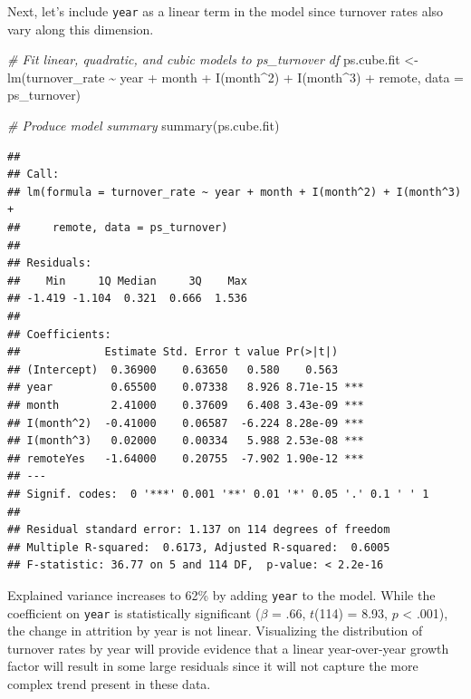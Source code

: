 \documentclass[
]{book}
\newenvironment{Shaded}{\begin{snugshade}}{\end{snugshade}}
\newcommand{\AttributeTok}[1]{\textcolor[rgb]{0.77,0.63,0.00}{#1}}
\newcommand{\CommentTok}[1]{\textcolor[rgb]{0.56,0.35,0.01}{\textit{#1}}}
\newcommand{\DecValTok}[1]{\textcolor[rgb]{0.00,0.00,0.81}{#1}}
\newcommand{\FunctionTok}[1]{\textcolor[rgb]{0.00,0.00,0.00}{#1}}
\newcommand{\NormalTok}[1]{#1}
\newcommand{\OtherTok}[1]{\textcolor[rgb]{0.56,0.35,0.01}{#1}}
\newcommand{\SpecialCharTok}[1]{\textcolor[rgb]{0.00,0.00,0.00}{#1}}
\begin{document}
Next, let's include \texttt{year} as a linear term in the model since turnover rates also vary along this dimension.

\begin{Shaded}
\begin{Highlighting}[]
\CommentTok{\# Fit linear, quadratic, and cubic models to ps\_turnover df}
\NormalTok{ps.cube.fit }\OtherTok{\textless{}{-}} \FunctionTok{lm}\NormalTok{(turnover\_rate }\SpecialCharTok{\textasciitilde{}}\NormalTok{ year }\SpecialCharTok{+}\NormalTok{ month }\SpecialCharTok{+} \FunctionTok{I}\NormalTok{(month}\SpecialCharTok{\^{}}\DecValTok{2}\NormalTok{) }\SpecialCharTok{+} \FunctionTok{I}\NormalTok{(month}\SpecialCharTok{\^{}}\DecValTok{3}\NormalTok{) }\SpecialCharTok{+}\NormalTok{ remote, }\AttributeTok{data =}\NormalTok{ ps\_turnover)}

\CommentTok{\# Produce model summary}
\FunctionTok{summary}\NormalTok{(ps.cube.fit)}
\end{Highlighting}
\end{Shaded}

\begin{verbatim}
## 
## Call:
## lm(formula = turnover_rate ~ year + month + I(month^2) + I(month^3) + 
##     remote, data = ps_turnover)
## 
## Residuals:
##    Min     1Q Median     3Q    Max 
## -1.419 -1.104  0.321  0.666  1.536 
## 
## Coefficients:
##             Estimate Std. Error t value Pr(>|t|)    
## (Intercept)  0.36900    0.63650   0.580    0.563    
## year         0.65500    0.07338   8.926 8.71e-15 ***
## month        2.41000    0.37609   6.408 3.43e-09 ***
## I(month^2)  -0.41000    0.06587  -6.224 8.28e-09 ***
## I(month^3)   0.02000    0.00334   5.988 2.53e-08 ***
## remoteYes   -1.64000    0.20755  -7.902 1.90e-12 ***
## ---
## Signif. codes:  0 '***' 0.001 '**' 0.01 '*' 0.05 '.' 0.1 ' ' 1
## 
## Residual standard error: 1.137 on 114 degrees of freedom
## Multiple R-squared:  0.6173, Adjusted R-squared:  0.6005 
## F-statistic: 36.77 on 5 and 114 DF,  p-value: < 2.2e-16
\end{verbatim}

Explained variance increases to 62\% by adding \texttt{year} to the model. While the coefficient on \texttt{year} is statistically significant (\(\beta\) = .66, \(t\)(114) = 8.93, \(p\) \textless{} .001), the change in attrition by year is not linear. Visualizing the distribution of turnover rates by year will provide evidence that a linear year-over-year growth factor will result in some large residuals since it will not capture the more complex trend present in these data.
\end{document}
